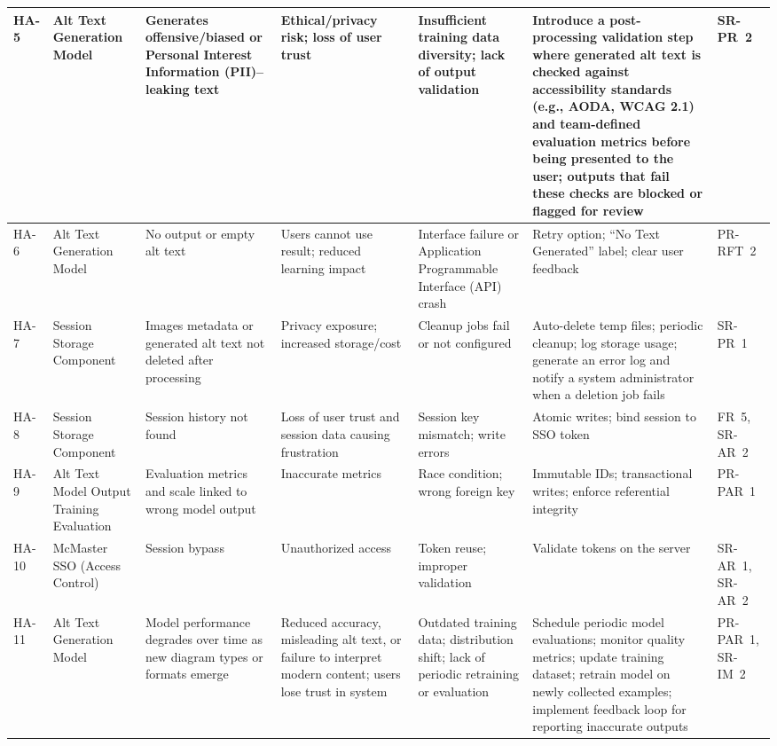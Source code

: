 \documentclass{article}
\begin{document}
\begin{landscape}
\begin{longtable}{|p{1.2cm}|p{2.0cm}|p{3.0cm}|p{3.2cm}|p{3.2cm}|p{4.0cm}|p{2.6cm}|}
    HA-5 & Alt Text Generation Model &
    Generates offensive/biased or Personal Interest Information (PII)–leaking text &
    Ethical/privacy risk; loss of user trust &
    Insufficient training data diversity; lack of output validation &
    Introduce a post-processing validation step where generated alt text is checked against accessibility standards (e.g., AODA, WCAG 2.1) and team-defined evaluation metrics before being presented to the user; outputs that fail these checks are blocked or flagged for review &
    SR-PR~2 \\ \hline

    
    HA-6 & Alt Text Generation Model &
    No output or empty alt text &
    Users cannot use result; reduced learning impact &
    Interface failure or Application Programmable Interface (API) crash &
    Retry option; “No Text Generated” label; clear user feedback &
    PR-RFT~2 \\ \hline
    
    HA-7 & Session Storage Component &
    Images metadata or generated alt text not deleted after processing &
    Privacy exposure; increased storage/cost &
    Cleanup jobs fail or not configured &
    Auto-delete temp files; periodic cleanup; log storage usage; generate an error log and notify a system administrator when a deletion job fails &
    SR-PR~1 \\ \hline

    
    HA-8 & Session Storage Component &
    Session history not found &
    Loss of user trust and session data causing frustration &
    Session key mismatch; write errors &
    Atomic writes; bind session to SSO token &
    FR~5, SR-AR~2 \\ \hline
    
    HA-9 & Alt Text Model Output Training Evaluation &
    Evaluation metrics and scale linked to wrong model output &
    Inaccurate metrics &
    Race condition; wrong foreign key &
    Immutable IDs; transactional writes; enforce referential integrity &
    PR-PAR~1 \\ \hline
    
    HA-10 & McMaster SSO (Access Control) &
    Session bypass &
    Unauthorized access &
    Token reuse; improper validation &
    Validate tokens on the server &
    SR-AR~1, SR-AR~2 \\ \hline

    HA-11 & Alt Text Generation Model &
    Model performance degrades over time as new diagram types or formats emerge &
    Reduced accuracy, misleading alt text, or failure to interpret modern content; users lose trust in system &
    Outdated training data; distribution shift; lack of periodic retraining or evaluation &
    Schedule periodic model evaluations; monitor quality metrics; update training dataset; retrain model on newly collected examples; implement feedback loop for reporting inaccurate outputs &
    PR-PAR~1, SR-IM~2 \\


    \end{longtable}
    
\end{landscape}
    
\end{document}
